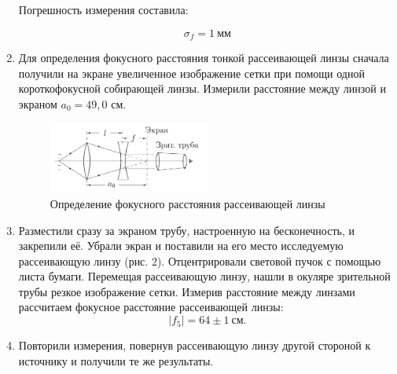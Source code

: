 \documentclass[a4paper, 12pt]{article}%
\begin{document}
\begin{enumerate}
        Погрешность измерения составила:
        
        \[\sigma_f = 1 \: \text{мм}\]	
	
		\item Для определения фокусного расстояния тонкой рассеивающей линзы сначала получили на экране увеличенное изображение сетки при помощи одной короткофокусной собирающей линзы. Измерили расстояние между линзой и экраном $a_0 = 49{,}0$ см.
									
		\begin{figure}
			\begin{center}
				\includegraphics[width = 0.5\textwidth]{images/412-2.png}
				\caption{Определение фокусного расстояния рассеивающей линзы}
			\end{center}
		\end{figure}
	
		\item Разместили сразу за экраном трубу, настроенную на бесконечность, и закрепили её. Убрали экран и поставили на его место исследуемую рассеивающую линзу (рис. 2). Отцентрировали световой пучок с помощью листа бумаги. Перемещая рассеивающую линзу, нашли в окуляре зрительной трубы резкое изображение сетки. Измерив расстояние между линзами рассчитаем фокусное расстояние рассеивающей линзы:
		\begin{equation*}
		|f_5| = 64 \pm 1 \: \text{см}.
		\end{equation*}
		
		\item Повторили измерения, повернув рассеивающую линзу другой стороной к источнику и получили те же результаты.
	\end{enumerate}
\end{document}
